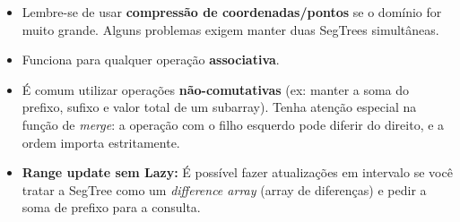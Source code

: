 \begin{itemize}
    \item Lembre-se de usar \textbf{compressão de coordenadas/pontos} se o domínio for muito grande. Alguns problemas exigem manter duas SegTrees simultâneas.
    \item Funciona para qualquer operação \textbf{associativa}.
    \item É comum utilizar operações \textbf{não-comutativas} (ex: manter a soma do prefixo, sufixo e valor total de um subarray). Tenha atenção especial na função de \textit{merge}: a operação com o filho esquerdo pode diferir do direito, e a ordem importa estritamente.
    \item \textbf{Range update sem Lazy:} É possível fazer atualizações em intervalo se você tratar a SegTree como um \textit{difference array} (array de diferenças) e pedir a soma de prefixo para a consulta.
\end{itemize}